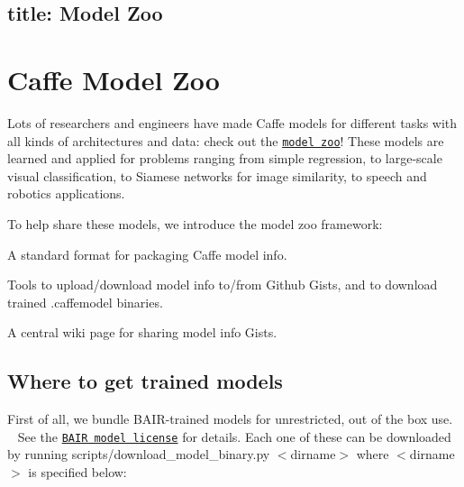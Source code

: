 

 \subsection*{title\+: Model Zoo }

\section*{Caffe Model Zoo}

Lots of researchers and engineers have made Caffe models for different tasks with all kinds of architectures and data\+: check out the \href{https://github.com/BVLC/caffe/wiki/Model-Zoo}{\tt model zoo}! These models are learned and applied for problems ranging from simple regression, to large-\/scale visual classification, to Siamese networks for image similarity, to speech and robotics applications.

To help share these models, we introduce the model zoo framework\+:


\begin{DoxyItemize}
\item A standard format for packaging Caffe model info.
\item Tools to upload/download model info to/from Github Gists, and to download trained {\ttfamily .caffemodel} binaries.
\item A central wiki page for sharing model info Gists.
\end{DoxyItemize}

\subsection*{Where to get trained models}

First of all, we bundle B\+A\+I\+R-\/trained models for unrestricted, out of the box use. ~\newline
 See the \href{#bair-model-license}{\tt B\+A\+IR model license} for details. Each one of these can be downloaded by running {\ttfamily scripts/download\+\_\+model\+\_\+binary.\+py $<$dirname$>$} where {\ttfamily $<$dirname$>$} is specified below\+:


